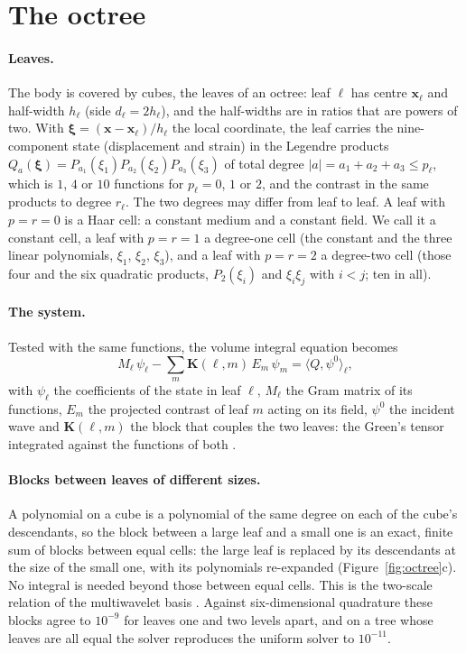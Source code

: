 \documentclass[11pt,a4paper]{article}
\newcommand{\bx}{\mathbf{x}}
\newcommand{\bK}{\mathbf{K}}
\begin{document}
\section{The octree}\label{sec:setting}

\paragraph{Leaves.} The body is covered by cubes, the leaves of an octree: leaf $\ell$ has centre
$\bx_\ell$ and half-width $h_\ell$ (side $d_\ell=2h_\ell$), and the half-widths are in ratios that are
powers of two. With $\boldsymbol\xi=(\bx-\bx_\ell)/h_\ell$ the local coordinate, the leaf carries the
nine-component state (displacement and strain) in the Legendre products
$Q_a(\boldsymbol\xi)=P_{a_1}(\xi_1)P_{a_2}(\xi_2)P_{a_3}(\xi_3)$ of total degree $|a|=a_1+a_2+a_3\le p_\ell$,
which is $1$, $4$ or $10$ functions for $p_\ell=0$, $1$ or $2$, and the contrast in the same products to
degree $r_\ell$. The two degrees may differ from leaf to leaf. A leaf with $p=r=0$ is a Haar cell: a
constant medium and a constant field. We call it a constant cell, a leaf with $p=r=1$ a degree-one cell
(the constant and the three linear polynomials, $\xi_1$, $\xi_2$, $\xi_3$), and a leaf with $p=r=2$ a
degree-two cell (those four and the six quadratic products, $P_2(\xi_i)$ and $\xi_i\xi_j$ with $i<j$; ten in all).

\paragraph{The system.} Tested with the same functions, the volume integral equation becomes
\begin{equation}\label{eq:system}
  M_\ell\,\psi_\ell-\sum_{m}\bK(\ell,m)\,E_m\,\psi_m=\langle Q,\psi^0\rangle_\ell ,
\end{equation}
with $\psi_\ell$ the coefficients of the state in leaf $\ell$, $M_\ell$ the Gram matrix of its
functions, $E_m$ the projected contrast of leaf $m$ acting on its field, $\psi^0$ the incident wave and
$\bK(\ell,m)$ the block that couples the two leaves: the Green's tensor integrated against the functions
of both \citep{NestorContinuum2026}.

\paragraph{Blocks between leaves of different sizes.} A polynomial on a cube is a polynomial of the
same degree on each of the cube's descendants, so the block between a large leaf and a small one is an
exact, finite sum of blocks between equal cells: the large leaf is replaced by its descendants at the
size of the small one, with its polynomials re-expanded (Figure~\ref{fig:octree}c). No integral is needed beyond those between equal cells. This is the two-scale
relation of the multiwavelet basis \citep{Alpert1993}. Against six-dimensional quadrature these blocks agree to $10^{-9}$ for leaves one and two
levels apart, and on a tree whose leaves are all equal the solver reproduces the uniform solver to
$10^{-11}$.
\end{document}
